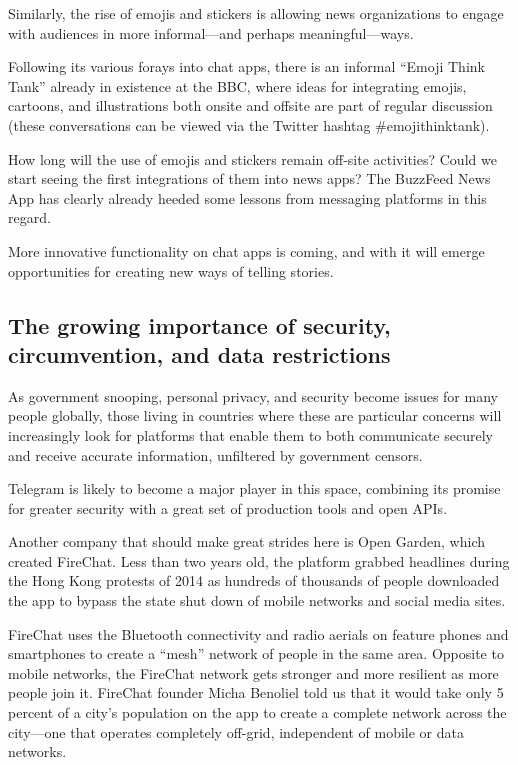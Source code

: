 \documentclass[notoc, symmetric, nobib, nols]{towcenter-guideto-book}
\begin{document}
Similarly, the rise of emojis and stickers is allowing news organizations to engage with audiences in more informal---and perhaps meaningful---ways. 

Following its various forays into chat apps, there is an informal ``Emoji Think Tank'' already in existence at the BBC, where ideas for integrating emojis, cartoons, and illustrations both onsite and offsite are part of regular discussion (these conversations can be viewed via the Twitter hashtag \#emojithinktank).

How long will the use of emojis and stickers remain off-site activities? Could we start seeing the first integrations of them into news apps? The BuzzFeed News App has clearly already heeded some lessons from messaging platforms in this regard.

More innovative functionality on chat apps is coming, and with it will emerge opportunities for creating new ways of telling stories.

\subsection{The growing importance of security, circumvention, and data restrictions}
As government snooping, personal privacy, and security become issues for many people globally, those living in countries where these are particular concerns will increasingly look for platforms that enable them to both communicate securely and receive accurate information, unfiltered by government censors. 

Telegram is likely to become a major player in this space, combining its promise for greater security with a great set of production tools and open APIs. 

Another company that should make great strides here is Open Garden, which created FireChat. Less than two years old, the platform grabbed headlines during the Hong Kong protests of 2014 as hundreds of thousands of people downloaded the app to bypass the state shut down of mobile networks and social media sites. 

FireChat uses the Bluetooth connectivity and radio aerials on feature phones and smartphones to create a ``mesh'' network of people in the same area. Opposite to mobile networks, the FireChat network gets stronger and more resilient as more people join it. FireChat founder Micha Benoliel told us that it would take only 5 percent of a city's population on the app to create a complete network across the city---one that operates completely off-grid, independent of mobile or data networks. 
\end{document}
